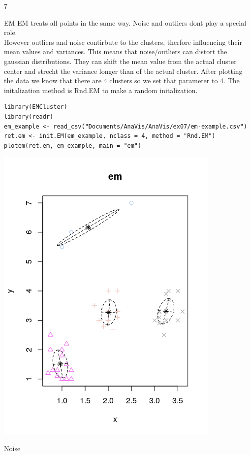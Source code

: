 \documentclass{article}
\begin{document}
\begin{ukon-infie}[12.12.17]{7}
\begin{exercise}[p=7]{EM}
		\question{}
		{
			EM treats all points in the same way. Noise and outliers dont play a special role.\\
			However outliers and noise contirbute to the clusters, therfore influencing their mean values and variances. This means that noise/outliers can distort the gaussian distributions. They can shift the mean value from the actual cluster center and strecht the variance longer than of the actual cluster.
		}
		\question{}
		{}
After plotting the data we know that there are 4 clusters so we set that parameter to 4. The initalization method is Rnd.EM to make a random initalization.
\begin{verbatim}
library(EMCluster)
library(readr)
em_example <- read_csv("Documents/AnaVis/AnaVis/ex07/em-example.csv")
ret.em <- init.EM(em_example, nclass = 4, method = "Rnd.EM")
plotem(ret.em, em_example, main = "em")
\end{verbatim}
\includegraphics[scale=0.5]{EMplot.png}
\end{exercise}

		
		\begin{exercise}[p=3]{Noise}
		

\end{exercise}
\end{ukon-infie}
\end{document}
